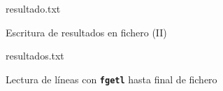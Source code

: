 \documentclass[8pt]{extarticle}
\newcommand{\cmdo}[1]{\texttt{\small\bfseries#1}} %
\newcommand{\hseparador}{\chline{gray!50!Header}}
\newcommand{\hlinefinal}{\chline{Header}\chline{Header}}
\begin{document}
\begin{multicols}{3}
        \begin{fileBlock}{resultado.txt}
        \end{fileBlock}
        
        \begin{exampleBlock}{Escritura de resultados en fichero (II)}
        \end{exampleBlock}
        
        \begin{fileBlock}{resultados.txt}
        \end{fileBlock}



%



        \begin{exampleBlock}{Lectura de l\'ineas con \cmdo{fgetl} hasta final de fichero}
        \end{exampleBlock}


\end{multicols}
\end{document}
